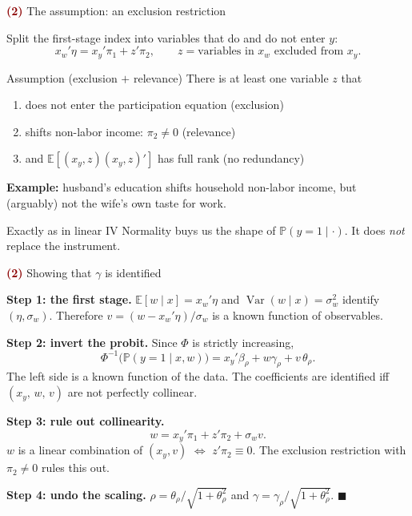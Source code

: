 \documentclass[aspectratio=169,11pt]{beamer}
\newcommand{\E}{\mathbb{E}}
\newcommand{\Pp}{\mathbb{P}}
\newcommand{\Part}[1]{\textcolor{DarkRed}{\textbf{(#1)}}}
\begin{document}
\begin{frame}{\Part{2} The assumption: an exclusion restriction}

Split the first-stage index into variables that do and do not enter $y$:
\[
x_w'\eta = x_y'\pi_1 + z'\pi_2,
\qquad z = \text{variables in } x_w \text{ excluded from } x_y .
\]

\begin{block}{Assumption (exclusion $+$ relevance)}
There is at least one variable $z$ that
\begin{enumerate}
  \item does not enter the participation equation \hfill (exclusion)
  \item shifts non-labor income: $\pi_2\neq 0$ \hfill (relevance)
  \item and $\E[(x_y, z)(x_y, z)']$ has full rank \hfill (no redundancy)
\end{enumerate}
\end{block}

\pause

\textbf{Example:} husband's education shifts household non-labor income,
but (arguably) not the wife's own taste for work.

\vspace{0.3em}

\begin{alertblock}{Exactly as in linear IV}
Normality buys us the shape of $\Pp(y=1\mid\cdot)$. It does \emph{not}
replace the instrument.
\end{alertblock}

\end{frame}

\begin{frame}{\Part{2} Showing that $\gamma$ is identified}

\textbf{Step 1: the first stage.}
$\E[w\mid x]=x_w'\eta$ and $\operatorname{Var}(w\mid x)=\sigma_w^2$ identify
$(\eta,\sigma_w)$. Therefore $v=(w-x_w'\eta)/\sigma_w$ is a known function
of observables.

\pause

\textbf{Step 2: invert the probit.} Since $\Phi$ is strictly increasing,
\[
\Phi^{-1}\!\big(\Pp(y=1\mid x,w)\big)
= x_y'\beta_\rho + w\gamma_\rho + v\,\theta_\rho .
\]
The left side is a known function of the data. The coefficients are
identified iff $(x_y,\,w,\,v)$ are not perfectly collinear.

\pause

\textbf{Step 3: rule out collinearity.}
\[
w = x_y'\pi_1 + z'\pi_2 + \sigma_w v .
\]
$w$ is a linear combination of $(x_y,v)$ \;$\Longleftrightarrow$\; $z'\pi_2\equiv0$.
The exclusion restriction with $\pi_2\neq0$ rules this out.

\pause

\textbf{Step 4: undo the scaling.}
$\rho=\theta_\rho/\sqrt{1+\theta_\rho^2}$ and
$\gamma=\gamma_\rho/\sqrt{1+\theta_\rho^2}$. \hfill $\blacksquare$

\end{frame}
\end{document}
